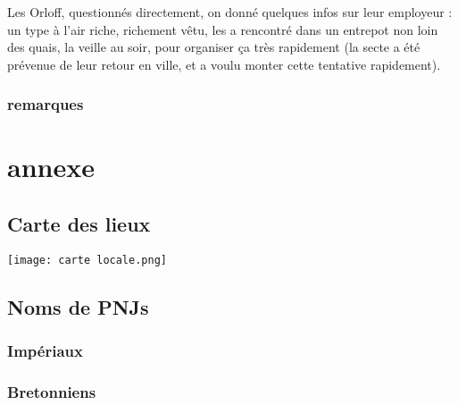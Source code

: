 \documentclass[10pt,a4paper]{book}
\begin{document}
Les Orloff, questionnés directement, on donné quelques infos sur leur employeur : un type à l'air riche, richement vêtu, les a rencontré dans un entrepot non loin des quais, la veille au soir, pour organiser ça très rapidement (la secte a été prévenue de leur retour en ville, et a voulu monter cette tentative rapidement).
\subsection{remarques}
\chapter*{annexe}
\section{Carte des lieux}
\texttt{[image: carte locale.png]}
\section*{Noms de PNJs}
\subsection*{Impériaux}
\subsection*{Bretonniens}
\end{document}
